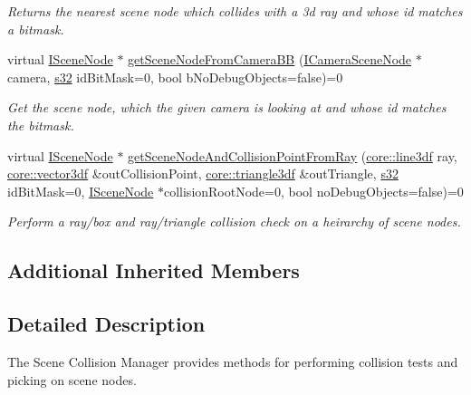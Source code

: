 \begin{DoxyCompactItemize}
\begin{DoxyCompactList}\small\item\em Returns the nearest scene node which collides with a 3d ray and whose id matches a bitmask. \end{DoxyCompactList}\item 
virtual \hyperlink{classirr_1_1scene_1_1ISceneNode}{I\+Scene\+Node} $\ast$ \hyperlink{classirr_1_1scene_1_1ISceneCollisionManager_ab29e0a261409a95a20e15ee09cc0de64}{get\+Scene\+Node\+From\+Camera\+BB} (\hyperlink{classirr_1_1scene_1_1ICameraSceneNode}{I\+Camera\+Scene\+Node} $\ast$camera, \hyperlink{namespaceirr_ac66849b7a6ed16e30ebede579f9b47c6}{s32} id\+Bit\+Mask=0, bool b\+No\+Debug\+Objects=false)=0
\begin{DoxyCompactList}\small\item\em Get the scene node, which the given camera is looking at and whose id matches the bitmask. \end{DoxyCompactList}\item 
virtual \hyperlink{classirr_1_1scene_1_1ISceneNode}{I\+Scene\+Node} $\ast$ \hyperlink{classirr_1_1scene_1_1ISceneCollisionManager_a25af822d52bce9acd88adfc7ce484982}{get\+Scene\+Node\+And\+Collision\+Point\+From\+Ray} (\hyperlink{namespaceirr_1_1core_a384a3bb17659466af5521c7f74cfcea7}{core\+::line3df} ray, \hyperlink{namespaceirr_1_1core_a06f169d08b5c429f5575acb7edbad811}{core\+::vector3df} \&out\+Collision\+Point, \hyperlink{namespaceirr_1_1core_a1112835405bbec5dadf031dc7934e7d0}{core\+::triangle3df} \&out\+Triangle, \hyperlink{namespaceirr_ac66849b7a6ed16e30ebede579f9b47c6}{s32} id\+Bit\+Mask=0, \hyperlink{classirr_1_1scene_1_1ISceneNode}{I\+Scene\+Node} $\ast$collision\+Root\+Node=0, bool no\+Debug\+Objects=false)=0
\begin{DoxyCompactList}\small\item\em Perform a ray/box and ray/triangle collision check on a heirarchy of scene nodes. \end{DoxyCompactList}\end{DoxyCompactItemize}
\subsection*{Additional Inherited Members}


\subsection{Detailed Description}
The Scene Collision Manager provides methods for performing collision tests and picking on scene nodes. 

